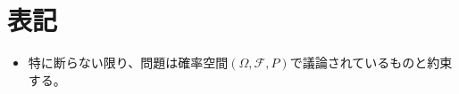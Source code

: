 \chapter{表記}
    \begin{itemize}
        \item 特に断らない限り、問題は確率空間$(\Omega,\mathcal{F},P)$で議論されているものと約束する。
    \end{itemize}